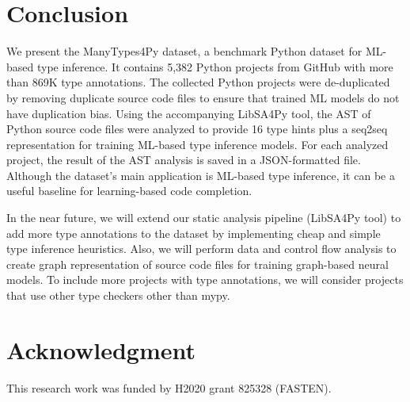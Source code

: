 \documentclass[10pt, conference]{IEEEtran}
\begin{document}
\section{Conclusion}
We present the ManyTypes4Py dataset, a benchmark Python dataset for ML-based type inference. It contains 5,382 Python projects from GitHub with more than 869K type annotations. The collected Python projects were de-duplicated by removing duplicate source code files to ensure that trained ML models do not have duplication bias. Using the accompanying LibSA4Py tool, the AST of Python source code files were analyzed to provide 16 type hints plus a seq2seq representation for training ML-based type inference models. For each analyzed project, the result of the AST analysis is saved in a JSON-formatted file. Although the dataset's main application is ML-based type inference, it can be a useful baseline for learning-based code completion.

In the near future, we will extend our static analysis pipeline (LibSA4Py tool) to add more type annotations to the dataset by implementing cheap and simple type inference heuristics. Also, we will perform data and control flow analysis to create graph representation of source code files for training graph-based neural models. To include more projects with type annotations, we will consider projects that use other type checkers other than mypy.

\section*{Acknowledgment}
This research work was funded by H2020 grant 825328 (FASTEN).



\end{document}
